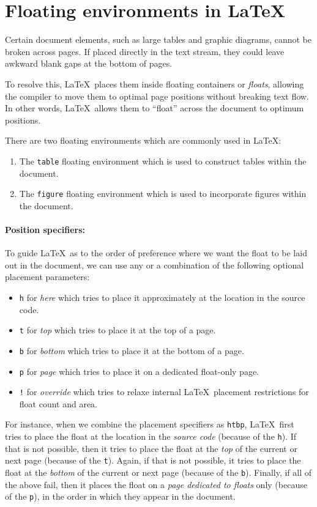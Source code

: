 \section{Floating environments in \LaTeX}
	Certain document elements, such as large tables and graphic diagrams, cannot be broken across pages. If placed directly in the text stream, they could leave awkward blank gaps at the bottom of pages.
	
	To resolve this, \LaTeX\ places them inside floating containers or \emph{floats}, allowing the compiler to move them to optimal page positions without breaking text flow. In other words, \LaTeX\ allows them to ``float'' across the document to optimum positions.
	
	There are two floating environments which are commonly used in \LaTeX:
	\begin{enumerate}
		\item The \lstinline|table| floating environment which is used to construct tables within the document.
		\item The \lstinline|figure| floating environment which is used to incorporate figures within the document.
	\end{enumerate}
	
	\paragraph{Position specifiers:} To guide \LaTeX\ as to the order of preference where we want the float to be laid out in the document, we can use any or a combination of the following optional placement parameters:
	\begin{itemize}
		\item \verb|h| for \emph{here} which tries to place it approximately at the location in the source code.
		\item \verb|t| for \emph{top} which tries to place it at the top of a page.
		\item \verb|b| for \emph{bottom} which tries to place it at the bottom of a page.
		\item \verb|p| for \emph{page} which tries to place it on a dedicated float-only page.
		\item \verb|!| for \emph{override} which tries to relaxe internal \LaTeX\ placement restrictions for float count and area.
	\end{itemize}
	For instance, when we combine the placement specifiers as \verb|htbp|, \LaTeX\ first tries to place the float at the location in the \emph{source code} (because of the \verb|h|). If that is not possible, then it tries to place the float at the \emph{top} of the current or next page (because of the \verb|t|). Again, if that is not possible, it tries to place the float at the \emph{bottom} of the current or next page (because of the \verb|b|). Finally, if all of the above fail, then it places the float on a \emph{page dedicated to floats} only (because of the \verb|p|), in the order in which they appear in the document.
	
